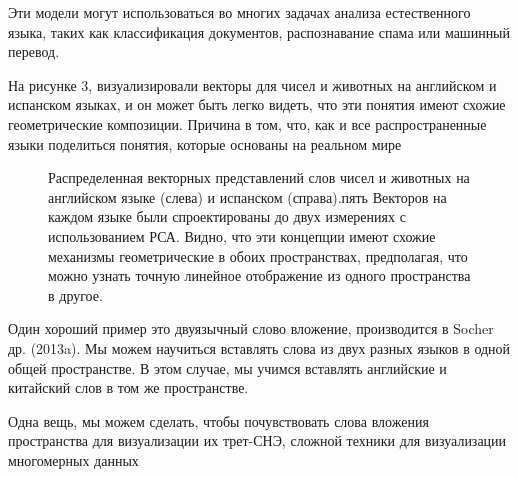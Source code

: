\documentclass[12pt]{article}
\begin{document}
Эти модели могут использоваться во многих задачах анализа естественного языка, таких как классификация документов, распознавание спама или машинный перевод.

На рисунке 3, визуализировали векторы для чисел и животных на английском и испанском языках, и он может быть легко видеть, что эти понятия имеют схожие геометрические композиции. Причина в том, что, как и все распространенные языки поделиться понятия, которые основаны на реальном мире
	\begin{figure}[h]
		\noindent{}
		\caption{Распределенная векторных представлений слов чисел и животных на английском языке (слева) и испанском (справа).пять Векторов на каждом языке были спроектированы до двух измерениях с использованием РСА. Видно, что эти концепции имеют схожие механизмы геометрические в обоих пространствах, предполагая, что можно узнать точную линейное отображение из одного пространства в другое.}
		\label{figCurves}
	\end{figure}

Один хороший пример это двуязычный слово вложение, производится в Socher др. (2013a). Мы можем научиться вставлять слова из двух разных языков в одной общей пространстве. В этом случае, мы учимся вставлять английские и китайский слов в том же пространстве.

Одна вещь, мы можем сделать, чтобы почувствовать слова вложения пространства для визуализации их трет-СНЭ, сложной техники для визуализации многомерных данных
\end{document}
